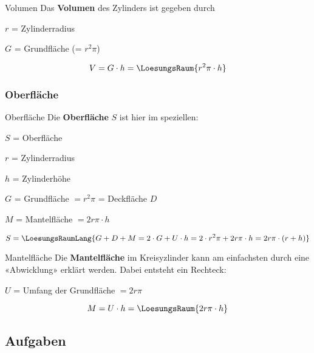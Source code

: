 \begin{gesetz}{Volumen}{}
  Das \textbf{Volumen} des Zylinders ist gegeben durch

  $r$ = Zylinderradius

  $G$ = Grundfläche (= $r^2\pi$)

  $$V = G\cdot{}h = \LoesungsRaum{r^2\pi\cdot{} h}$$
\end{gesetz}
\newpage

\subsubsection{Oberfläche}


\begin{gesetz}{Oberfläche}{}
  Die \textbf{Oberfläche} $S$ ist hier im speziellen:

  $S$ = Oberfläche

  $r$ = Zylinderradius

  $h$ = Zylinderhöhe

  $G$ = Grundfläche $=r^2\pi$ = Deckfläche $D$

  $M$ = Mantelfläche $=2r\pi\cdot{}h$
  
  $$S =\LoesungsRaumLang{G+D+M = 2\cdot{}G + U\cdot{}h = 2\cdot{}r^2\pi + 2r\pi\cdot{}h = 2r\pi\cdot{}(r + h)}$$
\end{gesetz}



\begin{bemerkung}{Mantelfläche}{}
  Die \textbf{Mantelfläche} im Kreisyzlinder kann am einfachsten durch eine «Abwicklung» erklärt werden. Dabei entsteht ein Rechteck:

  $U$ = Umfang der Grundfläche $= 2r\pi$
  
  $$M = U\cdot{}h = \LoesungsRaum{2r\pi\cdot{}h}$$
\end{bemerkung}


\newpage

\subsection*{Aufgaben}

\newpage
